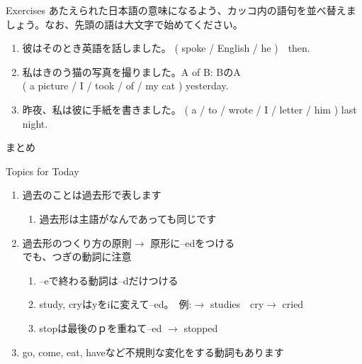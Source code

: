 \documentclass[aspectratio=169,xcolor={dvipsnames,table}]{beamer}
\newcommand{\myaudio}[1]{\href{#1}{\faVolumeUp}}
\begin{document}
\begin{frame}[plain]{Exercises}
あたえられた日本語の意味になるよう、カッコ内の語句を並べ替えましょう。なお、先頭の語は大文字で始めてください。 


\begin{enumerate}
 \item 彼はそのとき英語を話しました。%
\hfill{}( spoke / English  / he )~~then.\\
 \item 私はきのう猫の写真を撮りました。\hfill{\scriptsize A of B: BのA}\\
\mbox{}\hfill{}( a picture / I / took / of / my cat ) yesterday.\\
 \item 昨夜、私は彼に手紙を書きました。
( a / to / wrote / I / letter / him ) last night.\\
\end{enumerate}
\hfill\myaudio{./audio/025_past_do_17.mp3}

\end{frame}

\begin{frame}[plain]{まとめ}
 \begin{exampleblock}{Topics for Today}\small
\begin{enumerate}
 \item 過去のことは過去形で表します
       \begin{enumerate}
	\item 過去形は主語がなんであっても同じです
       \end{enumerate}
 \item 過去形のつくり方の原則$\longrightarrow$ 原形に--edをつける\\
でも、つぎの動詞に注意
       \begin{enumerate}
	\item --eで終わる動詞は--dだけつける
	\item study, cryはyをiに変えて--ed。　例:$\longrightarrow$ studies　cry$\longrightarrow$ cried
	\item stopは最後のｐを重ねて--ed $\longrightarrow$ stopped
       \end{enumerate}
 \item go, come, eat, haveなど不規則な変化をする動詞もあります
\end{enumerate}


\end{exampleblock}

\end{frame}
\end{document}
